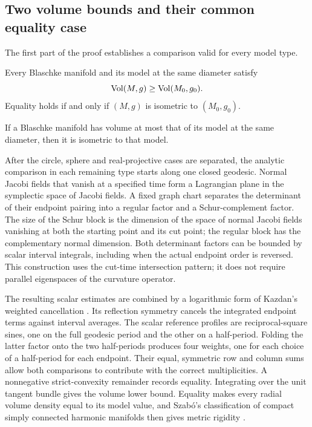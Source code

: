 \subsection{Two volume bounds and their common equality case}

The first part of the proof establishes a comparison valid for every
model type.

\begin{theorem}\label{thm:comparison}
Every Blaschke manifold and its model at the same diameter satisfy
\[
 \operatorname{Vol}(M,g)\ge\operatorname{Vol}(M_0,g_0).
\]
Equality holds if and only if $(M,g)$ is isometric to $(M_0,g_0)$.
\end{theorem}

\begin{corollary}
\label{thm:volume-reduction}
If a Blaschke manifold has volume at most that of its model at the
same diameter, then it is isometric to that model.
\end{corollary}

After the circle, sphere and real-projective cases are separated,
the analytic comparison in each remaining type starts along one
closed geodesic. Normal Jacobi fields that vanish at a specified
time form a Lagrangian plane in the symplectic space of Jacobi
fields. A fixed graph chart separates the determinant of their
endpoint pairing into a regular factor and a Schur-complement
factor. The size of the Schur block is the dimension of the space
of normal Jacobi fields vanishing at both the starting point and
its cut point; the regular block has the complementary normal
dimension. Both determinant factors can be bounded by scalar
interval integrals, including when the actual endpoint order is
reversed. This construction uses the cut-time intersection pattern;
it does not require parallel eigenspaces of the curvature operator.

The resulting scalar estimates are combined by a logarithmic form
of Kazdan's weighted cancellation
\citep[Appendix~E, especially E.4--E.8]{Kazdan1978AppendixE}.
Its reflection symmetry cancels the integrated endpoint terms
against interval averages. The scalar reference profiles are
reciprocal-square sines, one on the full geodesic period and the
other on a half-period. Folding the latter factor onto the two
half-periods produces four weights, one for each choice of a
half-period for each endpoint. Their equal, symmetric row and
column sums allow both comparisons to contribute with the
correct multiplicities. A nonnegative strict-convexity remainder
records equality. Integrating over the unit tangent bundle gives
the volume lower bound. Equality makes every radial volume density
equal to its model value, and Szab\'o's classification of compact
simply connected harmonic manifolds then gives metric rigidity
\citep{Szabo1990,Szabo1988}.


